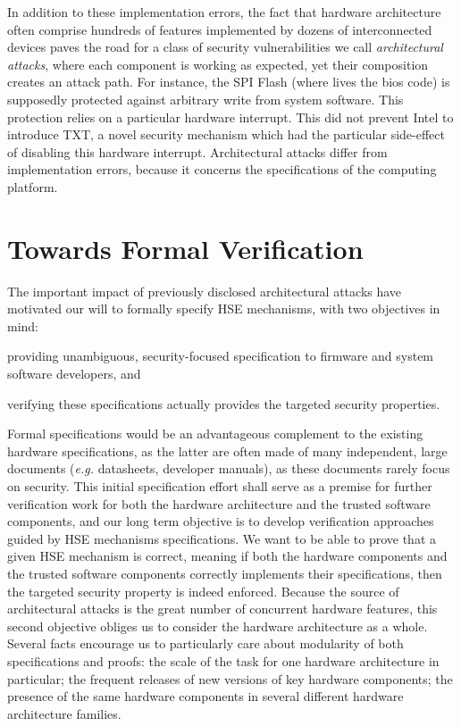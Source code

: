 In addition to these implementation errors, the fact that hardware architecture
often comprise hundreds of features implemented by dozens of interconnected
devices paves the road for a class of security vulnerabilities we call
\emph{architectural attacks},
%
%
where each component is working as expected, yet their composition creates an
attack path.
%
For instance, the SPI Flash (where lives the \ac{bios} code) is supposedly
protected against arbitrary write from system software.
%
This protection relies on a particular hardware interrupt.
%
This did not prevent Intel to introduce TXT, a novel security mechanism which
had the particular side-effect of disabling this hardware interrupt.
%
Architectural attacks differ from implementation errors, because it concerns the
specifications of the computing platform.

\section{Towards Formal Verification}

The important impact of previously disclosed architectural attacks have
motivated our will to formally specify HSE mechanisms, with two objectives in
mind:
%
\begin{inparaenum}[(1)]
\item providing unambiguous, security-focused specification to firmware and
  system software developers, and
%
\item verifying these specifications actually provides the targeted security
  properties.
\end{inparaenum}

Formal specifications would be an advantageous complement to the existing
hardware specifications, as the latter are often made of many independent, large
documents (\emph{e.g.}  datasheets, developer manuals), as these documents
rarely focus on security.
%
This initial specification effort shall serve as a premise for further
verification work for both the hardware architecture and the trusted software
components, and our long term objective is to develop verification approaches
guided by HSE mechanisms specifications.
%
We want to be able to prove that a given HSE mechanism is correct, meaning if
both the hardware components and the trusted software components correctly
implements their specifications, then the targeted security property is indeed
enforced.
%
Because the source of architectural attacks is the great number of concurrent
hardware features, this second objective obliges us to consider the hardware
architecture as a whole.
%
Several facts encourage us to particularly care about modularity of both
specifications and proofs:
%
the scale of the task for one hardware architecture in particular;
%
the frequent releases of new versions of key hardware components;
%
the presence of the same hardware components in several different hardware
architecture families.

